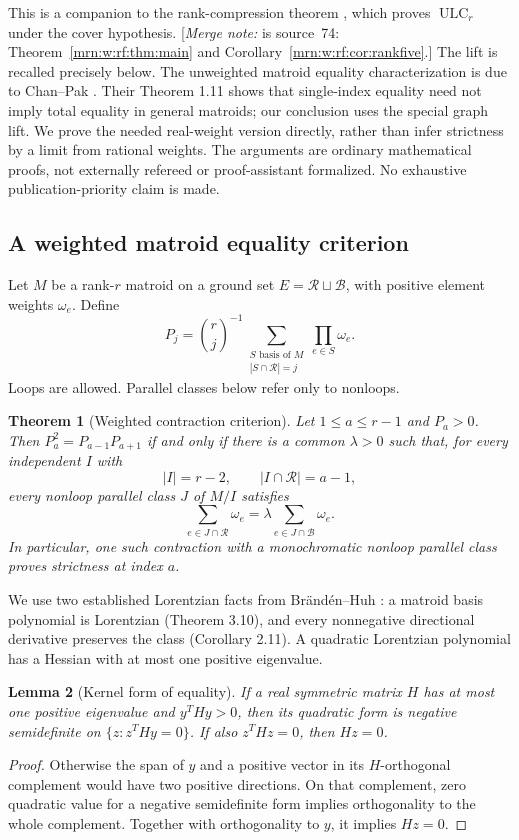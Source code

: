 \documentclass[11pt,a4paper]{article}
\newtheorem{theorem}{Theorem}[section]
\newtheorem{lemma}[theorem]{Lemma}
\theoremstyle{remark}\newtheorem{remark}[theorem]{Remark}
\newcommand{\ULC}{\operatorname{ULC}}      %
\newcommand{\RR}{\mathcal R}               %
\newcommand{\BB}{\mathcal B}               %
\newcommand{\mnote}[1]{[\textit{Merge note:} #1]}
\begin{document}
This is a companion to the rank-compression theorem \cite{b:m74}, which proves $\ULC_r$ under the cover hypothesis. \mnote{\cite{b:m74} is source~74: Theorem~\ref{mrn:w:rf:thm:main} and Corollary~\ref{mrn:w:rf:cor:rankfive}.} The lift is recalled precisely below. The unweighted matroid equality characterization is due to Chan--Pak \cite[Theorem 1.3]{b:CP}. Their Theorem 1.11 shows that single-index equality need not imply total equality in general matroids; our conclusion uses the special graph lift. We prove the needed real-weight version directly, rather than infer strictness by a limit from rational weights. The arguments are ordinary mathematical proofs, not externally refereed or proof-assistant formalized. No exhaustive publication-priority claim is made.

\subsection{A weighted matroid equality criterion}
Let $M$ be a rank-$r$ matroid on a ground set $E=\RR\sqcup\BB$, with positive element weights $\omega_e$. Define
\[
 P_j=\binom rj^{-1}
 \sum_{\substack{S\text{ basis of }M\\|S\cap\RR|=j}}\prod_{e\in S}\omega_e.
\]
Loops are allowed. Parallel classes below refer only to nonloops.

\begin{theorem}[Weighted contraction criterion]\label{mrn:w:se:thm:weighted}
Let $1\le a\le r-1$ and $P_a>0$. Then $P_a^2=P_{a-1}P_{a+1}$ if and only if there is a common $\lambda>0$ such that, for every independent $I$ with
\[
 |I|=r-2,\qquad |I\cap\RR|=a-1,
\]
every nonloop parallel class $J$ of $M/I$ satisfies
\begin{equation}\label{mrn:w:se:eq:parallel}
 \sum_{e\in J\cap\RR}\omega_e
 =\lambda\sum_{e\in J\cap\BB}\omega_e.
\end{equation}
In particular, one such contraction with a monochromatic nonloop parallel class proves strictness at index $a$.
\end{theorem}

We use two established Lorentzian facts from Br\"and\'en--Huh \cite{b:BH}: a matroid basis polynomial is Lorentzian (Theorem 3.10), and every nonnegative directional derivative preserves the class (Corollary 2.11). A quadratic Lorentzian polynomial has a Hessian with at most one positive eigenvalue.

\begin{lemma}[Kernel form of equality]\label{mrn:w:se:lem:kernel}
If a real symmetric matrix $H$ has at most one positive eigenvalue and $y^THy>0$, then its quadratic form is negative semidefinite on $\{z:z^THy=0\}$. If also $z^THz=0$, then $Hz=0$.
\end{lemma}
\begin{proof}
Otherwise the span of $y$ and a positive vector in its $H$-orthogonal complement would have two positive directions. On that complement, zero quadratic value for a negative semidefinite form implies orthogonality to the whole complement. Together with orthogonality to $y$, it implies $Hz=0$.
\end{proof}
\end{document}
